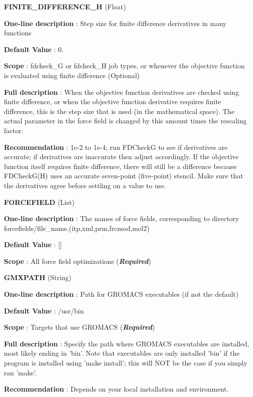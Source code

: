 \begin{DoxyItemize}
\item {\bfseries  F\-I\-N\-I\-T\-E\-\_\-\-D\-I\-F\-F\-E\-R\-E\-N\-C\-E\-\_\-\-H } (Float) \par
{\bfseries  One-\/line description }\-: Step size for finite difference derivatives in many functions \par
{\bfseries  Default Value }\-: 0. \par
{\bfseries  Scope }\-: fdcheck\-\_\-\-G or fdcheck\-\_\-\-H job types, or whenever the objective function is evaluated using finite difference (Optional) \par
{\bfseries  Full description }\-: When the objective function derivatives are checked using finite difference, or when the objective function derivative requires finite difference, this is the step size that is used (in the mathematical space). The actual parameter in the force field is changed by this amount times the rescaling factor. \par
{\bfseries  Recommendation }\-: 1e-\/2 to 1e-\/4; run F\-D\-Check\-G to see if derivatives are accurate; if derivatives are inaccurate then adjust accordingly. If the objective function itself requires finite difference, there will still be a difference because F\-D\-Check\-G(\-H) uses an accurate seven-\/point (five-\/point) stencil. Make sure that the derivatives agree before settling on a value to use.\end{DoxyItemize}
\begin{DoxyItemize}
\item {\bfseries  F\-O\-R\-C\-E\-F\-I\-E\-L\-D } (List) \par
{\bfseries  One-\/line description }\-: The names of force fields, corresponding to directory forcefields/file\-\_\-name.(itp,xml,prm,frcmod,mol2) \par
{\bfseries  Default Value }\-: \mbox{[}\mbox{]} \par
{\bfseries  Scope }\-: All force field optimizations ({\bfseries {\itshape Required}})\end{DoxyItemize}
\begin{DoxyItemize}
\item {\bfseries  G\-M\-X\-P\-A\-T\-H } (String) \par
{\bfseries  One-\/line description }\-: Path for G\-R\-O\-M\-A\-C\-S executables (if not the default) \par
{\bfseries  Default Value }\-: /usr/bin \par
{\bfseries  Scope }\-: Targets that use G\-R\-O\-M\-A\-C\-S ({\bfseries {\itshape Required}}) \par
{\bfseries  Full description }\-: Specify the path where G\-R\-O\-M\-A\-C\-S executables are installed, most likely ending in 'bin'. Note that executables are only installed 'bin' if the program is installed using 'make install'; this will N\-O\-T be the case if you simply ran 'make'. \par
{\bfseries  Recommendation }\-: Depends on your local installation and environment.\end{DoxyItemize}
